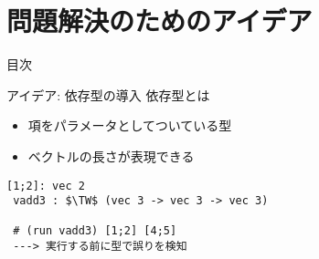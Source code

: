 \documentclass[dvipdfmx,aspectratio=169, 20pt]{beamer}
\renewcommand{\V}{\vdash}
\begin{document}
\section{問題解決のためのアイデア}

\begin{frame}{目次}
    \tableofcontents[currentsection]
\end{frame}

\begin{frame}[fragile]{アイデア: 依存型の導入}
    \renewcommand{\V}{\text{vec}\ }
    依存型とは
    \begin{itemize}
        \item 項をパラメータとしてついている型
        \item ベクトルの長さが表現できる
    \end{itemize}
    \begin{exampleblock}{}
        \begin{Verbatim}[commandchars=\\\{\},codes={\catcode`$=3\catcode`^=7}]
 [1;2]: vec 2
 vadd3 : $\TW$ (vec 3 -> vec 3 -> vec 3)

 # (run vadd3) [1;2] [4;5]
 ---> 実行する前に型で誤りを検知
 \end{Verbatim}
    \end{exampleblock}
\end{frame}
\end{document}
